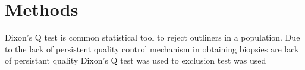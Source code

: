 \chapter{Methods}

Dixon's Q test is common statistical tool to reject outliners in a population. Due to the lack of persistent quality control mechanism in obtaining biopsies  are lack of persistant quality Dixon's Q test was used to   exclusion test was used 